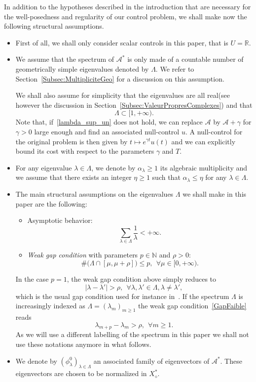 \documentclass[11pt]{article}
\theoremstyle{definition}
\numberwithin{equation}{section}
\numberwithin{figure}{section}
\numberwithin{table}{section}
\newcommand\A{\mathcal{A}}
\newcommand\As{\mathcal{A}^*}
\newcommand{\Xalphas}{X_\diamond^*}
\newcommand{\N}{\mathbb{N}}
\newcommand{\R}{\mathbb{R}}
\let\oldforall\forall
\renewcommand*{\forall}{\mathrel{\oldforall}}
\begin{document}
In addition to the hypotheses described in the introduction that are necessary for the well-posedness and regularity of our control problem, we shall make now the following structural assumptions.
\begin{itemize}
\item First of all, we shall only consider scalar controls in this paper, that is $U=\R$.
\item We assume that the spectrum of $\As$ is only made of a countable number of geometrically simple eigenvalues denoted by $\Lambda$. We refer to Section~\ref{Subsec:MultipliciteGeo} for a discussion on this assumption.

We shall also assume for simplicity that the eigenvalues are all real\linebreak(see however the discussion in Section~\ref{Subsec:ValeurPropresComplexes}) and that
\begin{equation}\label{lambda_sup_un}
\Lambda\subset[1,+\infty).
\end{equation}
Note that, if~\eqref{lambda_sup_un} does not hold, we can replace $\A$ by $\A+\gamma$ for $\gamma>0$ large enough and find an associated null-control $u$. A null-control for the original problem is then given by $t\mapsto e^{\gamma t} u(t)$ and we can explicitly bound its cost with respect to the parameters $\gamma$ and $T$.
\item For any eigenvalue $\lambda \in \Lambda$, we denote by $\alpha_\lambda \geq 1$ its algebraic multiplicity and we assume that there exists an integer $\eta \geq 1$ such that $\alpha_\lambda\leq \eta$ for any $\lambda\in \Lambda$.
\item The main structural assumptions on the eigenvalues $\Lambda$ we shall make in this paper are the following:
\begin{itemize}
\item Asymptotic behavior:
\begin{equation}\label{SommabiliteVP}
\sum_{\lambda\in \Lambda} \frac{1}{\lambda} < +\infty.
\end{equation}
\item \emph{Weak gap condition} with parameters $p\in \N$ and $\rho>0$:
\begin{equation}\label{GapFaible}
\# \bigg(\Lambda \cap [\mu,\mu+\rho] \bigg) \leq p, \ \ \forall \mu\in [0,+\infty).
\end{equation}
\end{itemize}
In the case $p=1$, the weak gap condition above simply reduces to
\[
|\lambda-\lambda'|> \rho, \ \ \forall \lambda,\lambda'\in \Lambda, \lambda\neq\lambda',
\]
which is the usual gap condition used for instance in~\cite{FattoriniRussell71}. If the spectrum $\Lambda$ is increasingly indexed as $\Lambda= (\lambda_m)_{m \geq 1}$ the weak gap condition~\eqref{GapFaible} reads
\[
\lambda_{m+p}-\lambda_m > \rho, \ \ \forall m \geq 1.
\]
As we will use a different labelling of the spectrum in this paper we shall not use these notations anymore in what follows.
\item We denote by $(\phi_\lambda^0)_{\lambda\in \Lambda}$ an associated family of eigenvectors of $\As$. These eigenvectors are chosen to be normalized in $\Xalphas$.


\end{itemize}
\end{document}
